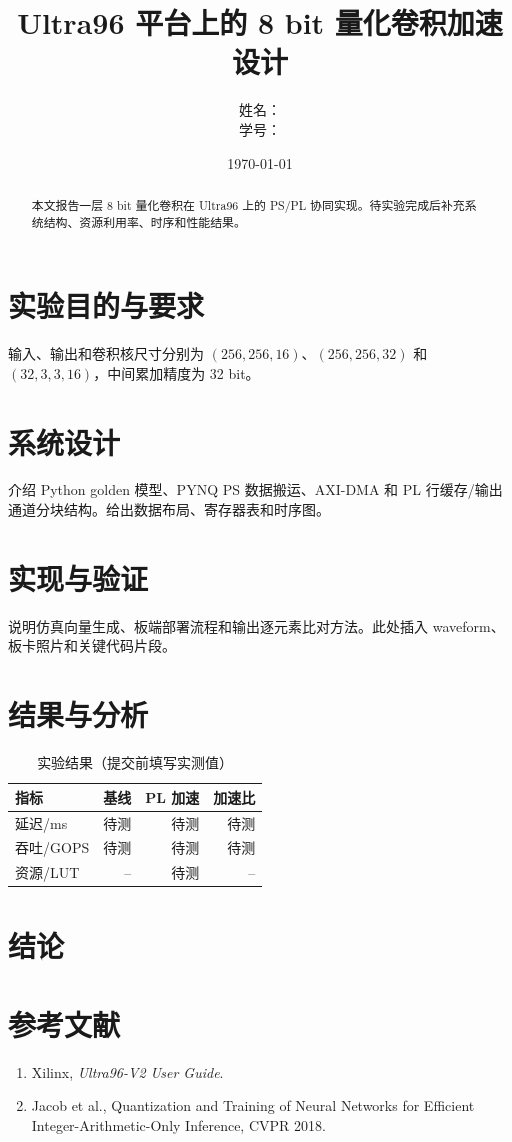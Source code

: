 \documentclass[UTF8,a4paper,12pt]{ctexart}
\title{Ultra96 平台上的 8 bit 量化卷积加速设计}
\author{姓名：\underline{\hspace{4cm}}\\学号：\underline{\hspace{4cm}}}
\date{\today}
\begin{document}
\maketitle
\begin{abstract}本文报告一层 8 bit 量化卷积在 Ultra96 上的 PS/PL 协同实现。待实验完成后补充系统结构、资源利用率、时序和性能结果。\end{abstract}
\section{实验目的与要求}
输入、输出和卷积核尺寸分别为 $(256,256,16)$、$(256,256,32)$ 和 $(32,3,3,16)$，中间累加精度为 32 bit。
\section{系统设计}
介绍 Python golden 模型、PYNQ PS 数据搬运、AXI-DMA 和 PL 行缓存/输出通道分块结构。给出数据布局、寄存器表和时序图。
\section{实现与验证}
说明仿真向量生成、板端部署流程和输出逐元素比对方法。此处插入 waveform、板卡照片和关键代码片段。
\section{结果与分析}
\begin{table}[h]\centering\begin{tabular}{lrrr}\toprule 指标 & 基线 & PL 加速 & 加速比\\\midrule 延迟/ms & 待测 & 待测 & 待测\\吞吐/GOPS & 待测 & 待测 & 待测\\资源/LUT & -- & 待测 & --\\\bottomrule\end{tabular}\caption{实验结果（提交前填写实测值）}\end{table}
\section{结论}\section*{参考文献}\begin{enumerate}\item Xilinx, \textit{Ultra96-V2 User Guide}.\item Jacob et al., Quantization and Training of Neural Networks for Efficient Integer-Arithmetic-Only Inference, CVPR 2018.\end{enumerate}
\end{document}
